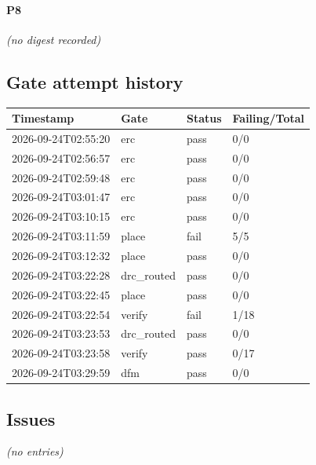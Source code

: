 \documentclass[11pt,a4paper]{article}
\begin{document}
\paragraph*{P8}
\emph{(no digest recorded)}
\subsection*{Gate attempt history}
{\small
\begin{longtable}{llll}
\toprule
\textbf{Timestamp} & \textbf{Gate} & \textbf{Status} & \textbf{Failing/Total} \\
\midrule
\endhead
2026-09-24T02:55:20 & erc & pass & 0/0 \\
2026-09-24T02:56:57 & erc & pass & 0/0 \\
2026-09-24T02:59:48 & erc & pass & 0/0 \\
2026-09-24T03:01:47 & erc & pass & 0/0 \\
2026-09-24T03:10:15 & erc & pass & 0/0 \\
2026-09-24T03:11:59 & place & fail & 5/5 \\
2026-09-24T03:12:32 & place & pass & 0/0 \\
2026-09-24T03:22:28 & drc\_routed & pass & 0/0 \\
2026-09-24T03:22:45 & place & pass & 0/0 \\
2026-09-24T03:22:54 & verify & fail & 1/18 \\
2026-09-24T03:23:53 & drc\_routed & pass & 0/0 \\
2026-09-24T03:23:58 & verify & pass & 0/17 \\
2026-09-24T03:29:59 & dfm & pass & 0/0 \\
\bottomrule
\end{longtable}
}
\subsection*{Issues}
\emph{(no entries)}
\end{document}
